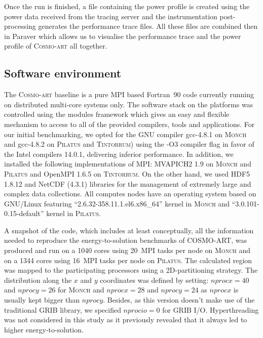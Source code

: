 Once  the run  is finished,  a file  containing the  power  profile is
created using the power data  received from the tracing server and the
instrumentation post-processing generates the performance trace files.
All  these files  are  combined then  in  Paraver which  allows us  to
visualise   the   performance  trace   and   the   power  profile   of
\textsc{Cosmo-art} all together.

\subsection{Software environment}
\label{subsec:3.2}

The \textsc{Cosmo-art}  baseline is a  pure MPI based  Fortran~90 code
currently  running  on   distributed  multi-core  systems  only.   The
software stack on the platforms was controlled using the modules
framework which gives an easy  and flexible mechanism to access to all
of the  provided compilers, tools  and applications.  For  our initial
benchmarking,   we  opted   for   the  GNU   compiler  gcc-4.8.1   on
\textsc{Monch} and gcc-4.8.2 on  \textsc{Pilatus} and \textsc{Tintorrum}) using the -O3 compiler
flag  in favor  of the  Intel compilers 14.0.1,  delivering inferior
performance.  In  addition, we installed the following implementations of MPI: MVAPICH2 1.9 on \textsc{Monch} and \textsc{Pilatus} and  OpenMPI 1.6.5 on \textsc{Tintorrum}. On the other hand, we  used HDF5 1.8.12 and NetCDF  (4.3.1) libraries for  the management  of extremely  large and
complex data collections.  All computes nodes have an operating system
based on GNU/Linux featuring ``2.6.32-358.11.1.el6.x86\_64'' kernel in
\textsc{Monch}     and      ``3.0.101-0.15-default''     kernel     in
\textsc{Pilatus}.

A snapshot of the code,  which includes at least conceptually, all the
information needed  to reproduce the  energy-to-solution benchmarks of
\textsc{COSMO-ART}, was produced and run  on a 1040 cores using 20~MPI
tasks  per node on  \textsc{Monch} and  on a  1344 cores  using 16~MPI
tasks per node on  \textsc{Pilatus}.  The calculated region was mapped
to the participating processors using a 2D-partitioning strategy.  The
distribution along the $x$ and $y$ coordinates was defined by setting:
$nprocx=40$  and $nprocy=26$  for \textsc{Monch}  and  $nprocx=28$ and
$nprocy=24$  as  $nprocx$  is   usually  kept  bigger  than  $nprocy$.
Besides,  as this  version doesn't  make use  of the  traditional GRIB
library, we  specified $nprocio=0$  for GRIB I/O.   Hyperthreading was
not considered in this study  as it previously revealed that it always
led to higher energy-to-solution.



